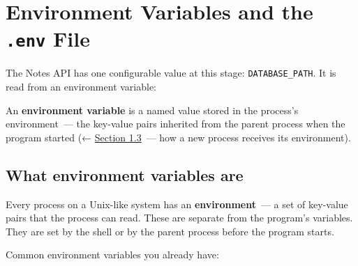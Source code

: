 \setcounter{section}{4}
\section{\texorpdfstring{Environment Variables and the \texttt{.env} File}{Environment Variables and the .env File}}\label{06-local-dependencies:65-environment-variables-and-the-env-file}

The Notes API has one configurable value at this stage: \texttt{DATABASE\_PATH}. It is read from an environment variable:

\begin{codebox}[short]

\begin{Shaded}
\begin{Highlighting}[]
\OperatorTok{=}\NormalTok{, }\NormalTok{)}
\end{Highlighting}
\end{Shaded}

\end{codebox}

\noindent{}An \textbf{environment variable} is a named value stored in the process's environment~--- the key-value pairs inherited from the parent process when the program started (← \hyperref[01-command-to-process:13-how-the-operating-system-starts-a-new-program-fork-and-exec]{Section 1.3}~--- how a new process receives its environment).

\subsection*{What environment variables are}\label{06-local-dependencies:what-environment-variables-are}

Every process on a Unix-like system has an \textbf{environment}~--- a set of key-value pairs that the process can read. These are separate from the program's variables. They are set by the shell or by the parent process before the program starts.

Common environment variables you already have:

\begin{codebox}[short]

\begin{Shaded}
\begin{Highlighting}[]
      
      
      
     
\end{Highlighting}
\end{Shaded}

\end{codebox}

